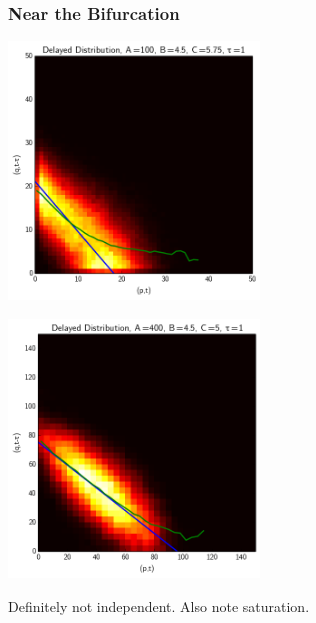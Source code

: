 \documentclass[xcolor={usenames,dvipsnames,svgnames},url=hyphens]{beamer}
\begin{document}
\begin{frame}
    \frametitle{Near the Bifurcation}

    \begin{overprint}
        \begin{center}
        \includegraphics[width=0.5\textwidth]{../results/presentation/ddjd-ca-a100-c5,8-t1.png}
        \end{center}
        \begin{center}
        \includegraphics[width=0.5\textwidth]{../results/presentation/ddjd-ca-a400-c5-t1.png}
        \end{center}
    \end{overprint}

    Definitely not independent. Also note saturation.
\end{frame}
\end{document}
